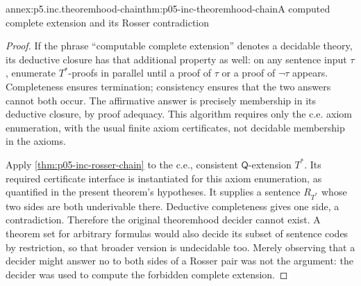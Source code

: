 \begin{annexitem}{annex:p5.inc.theoremhood-chain}{thm:p05-inc-theoremhood-chain}{A computed complete extension and its Rosser contradiction}
\begin{proof}
If the phrase ``computable complete extension'' denotes a decidable
theory, its deductive closure has that additional property as well:
on any sentence input \(\tau\), enumerate \(T^*\)-proofs in
parallel until a proof of \(\tau\) or a proof of \(\neg\tau\)
appears. Completeness ensures termination; consistency ensures that
the two answers cannot both occur. The affirmative answer is precisely
membership in its deductive closure, by proof adequacy. This algorithm
requires only the c.e. axiom enumeration, with the usual finite axiom
certificates, not decidable membership in the axioms.

Apply \cref{thm:p05-inc-rosser-chain} to the c.e., consistent
\(\mathsf Q\)-extension \(T^*\). Its required certificate
interface is instantiated for this axiom enumeration, as quantified
in the present theorem's hypotheses. It supplies a sentence \(R_{T^*}\)
whose two sides are both underivable there. Deductive completeness
gives one side, a contradiction. Therefore the original theoremhood
decider cannot exist. A theorem set for arbitrary formulas would also
decide its subset of sentence codes by restriction, so that broader
version is undecidable too. Merely observing that a decider might
answer no to both sides of a Rosser pair was not the argument: the
decider was used to compute the forbidden complete extension.
\end{proof}
\end{annexitem}


